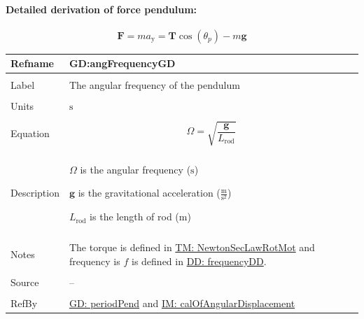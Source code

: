\documentclass[12pt]{article}
\begin{document}
\paragraph{Detailed derivation of force pendulum:}
\label{GD:vForceOnPendulumDeriv}
\begin{displaymath}
\mathbf{F}=m {a_{\text{y}}}=\mathbf{T} \cos\left({θ_{p}}\right)-m \mathbf{g}
\end{displaymath}
\vspace{\baselineskip}
\noindent
\begin{minipage}{\textwidth}
\begin{tabular}{>{\raggedright}p{}>{\raggedright\arraybackslash}p{}}
\toprule \textbf{Refname} & \textbf{GD:angFrequencyGD}
\label{GD:angFrequencyGD}
\\ \midrule \\
Label & The angular frequency of the pendulum
        
\\ \midrule \\
Units & ${\text{s}}$
        
\\ \midrule \\
Equation & \begin{displaymath}
           Ω=\sqrt{\frac{\mathbf{g}}{{L_{\text{rod}}}}}
           \end{displaymath}
\\ \midrule \\
Description & \begin{symbDescription}
              \item{$Ω$ is the angular frequency (${\text{s}}$)}
              \item{$\mathbf{g}$ is the gravitational acceleration ($\frac{\text{m}}{\text{s}^{2}}$)}
              \item{${L_{\text{rod}}}$ is the length of rod (${\text{m}}$)}
              \end{symbDescription}
\\ \midrule \\
Notes & The torque is defined in \hyperref[TM:NewtonSecLawRotMot]{TM: NewtonSecLawRotMot} and frequency is $f$ is defined in \hyperref[DD:frequencyDD]{DD: frequencyDD}.
        
\\ \midrule \\
Source & --
         
\\ \midrule \\
RefBy & \hyperref[GD:periodPend]{GD: periodPend} and \hyperref[IM:calOfAngularDisplacement]{IM: calOfAngularDisplacement}
        
\\ \bottomrule
\end{tabular}
\end{minipage}
\end{document}

